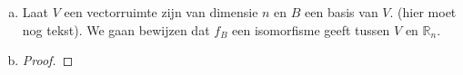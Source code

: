 \documentclass[12pt, a4paper]{article}
\begin{document}
\begin{enumerate}[(a).]
    \item \label{c}
     Laat $V$ een vectorruimte zijn van dimensie $n$ en $B$ een basis van $V$. (hier moet nog tekst). \newline
     We gaan bewijzen dat $f_B$ een isomorfisme geeft tussen $V$ en $\mathbb{R}_n$.


 
        \item \label{d}
    
\begin{proof}
   
\end{proof}

\end{enumerate}
\end{document}
